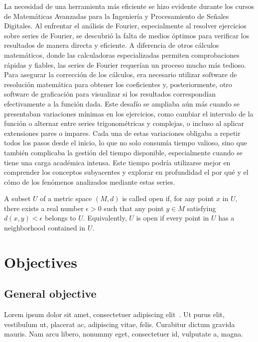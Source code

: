La necesidad de una herramienta más eficiente se hizo evidente durante los cursos de Matemáticas Avanzadas para la Ingeniería y Procesamiento de Señales Digitales. Al enfrentar el análisis de Fourier, especialmente al resolver ejercicios sobre series de Fourier, se descubrió la falta de medios óptimos para verificar los resultados de manera directa y eficiente. A diferencia de otros cálculos matemáticos, donde las calculadoras especializadas permiten comprobaciones rápidas y fiables, las series de Fourier requerían un proceso mucho más tedioso. Para asegurar la corrección de los cálculos, era necesario utilizar software de resolución matemática para obtener los coeficientes y, posteriormente, otro software de graficación para visualizar si los resultados correspondían efectivamente a la función dada. Este desafío se ampliaba aún más cuando se presentaban variaciones mínimas en los ejercicios, como cambiar el intervalo de la función o alternar entre series trigonométricas y complejas, o incluso al aplicar extensiones pares o impares. Cada una de estas variaciones obligaba a repetir todos los pasos desde el inicio, lo que no solo consumía tiempo valioso, sino que también complicaba la gestión del tiempo disponible, especialmente cuando se tiene una carga académica intensa. Este tiempo podría utilizarse mejor en comprender los conceptos subyacentes y explorar en profundidad el por qué y el cómo de los fenómenos analizados mediante estas series.
\begin{definition}
A subset $U$ of a metric space $(M, d)$ is called open if, for any point $x$ in $U$, there exists a real number $\epsilon > 0$ such that any point $y\in M$ satisfying $d(x, y) < \epsilon$ belongs to $U$. Equivalently, $U$ is open if every point in $U$ has a neighborhood contained in $U$.
\end{definition}
\lipsum[1]

\section{Objectives}
\subsection{General objective}
Lorem ipsum dolor sit amet, consectetuer adipiscing elit~\cite{adam2015higgs, atlas2014neural, baldi2014searching}. Ut purus elit, vestibulum ut, placerat ac, adipiscing vitae, felis. Curabitur dictum gravida mauris. Nam arcu libero, nonummy eget, consectetuer id, vulputate a, magna.

